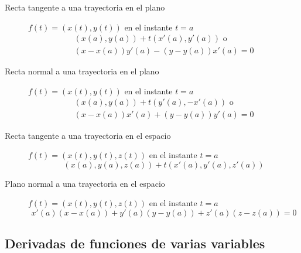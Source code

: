 \begin{multicols}{2}
\begin{tcolorbox}[hbox, title=Rectas tangente y normal en el plano]
\begin{minipage}{0.4\textwidth}
\flushleft
\begin{description}
\item[Recta tangente a una trayectoria en el plano] \mbox{$f(t)=(x(t),y(t))$} en el instante $t=a$
      \[
      \begin{array}{c}
      (x(a),y(a))+t(x'(a),y'(a)) \mbox{ o } \\
      (x-x(a))y'(a)-(y-y(a))x'(a)=0
      \end{array}
      \]
\item[Recta normal a una trayectoria en el plano] \mbox{$f(t)=(x(t),y(t))$} en el instante $t=a$
      \[
      \begin{array}{c}
      (x(a),y(a))+t(y'(a),-x'(a)) \mbox{ o } \\
      (x-x(a))x'(a)+(y-y(a))y'(a)=0
      \end{array}
      \]
\end{description}
\end{minipage}
\end{tcolorbox}

\begin{tcolorbox}[hbox, title=Recta tangente y plano normal en el espacio]
\begin{minipage}{0.4\textwidth}
\flushleft
\begin{description}
\item[Recta tangente a una trayectoria en el espacio] \mbox{$f(t)=(x(t),y(t),z(t))$} en el instante $t=a$
      \[
      (x(a),y(a),z(a))+t(x'(a),y'(a),z'(a))
      \]
\item[Plano normal a una trayectoria en el espacio] \mbox{$f(t)=(x(t),y(t),z(t))$} en el instante $t=a$
      \[
      x'(a)(x-x(a))+y'(a)(y-y(a))+z'(a)(z-z(a))=0
      \]
\end{description}
\end{minipage}
\end{tcolorbox}



\subsection*{Derivadas de funciones de varias variables}


\end{multicols}
